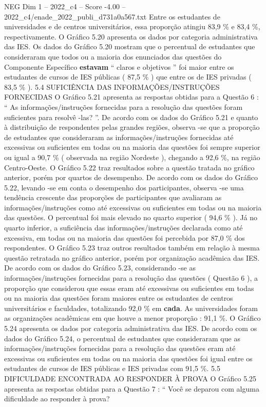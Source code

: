 \begin{textsample}{NEG Dim 1 – 2022\_c4 – Score -4.00 – 2022\_c4/enade\_2022\_publi\_d731a0a567.txt}
Entre os estudantes de universidades e de centros universitários, essa proporção atingiu 83,9 \% e 83,4 \%, respectivamente.
O Gráfico 5.20 apresenta os dados por categoria administrativa das IES.
Os dados do Gráfico 5.20 mostram que o percentual de estudantes que consideraram que todos ou a maioria dos enunciados das questões do Componente Específico \textbf{estavam} “ claros e objetivos ” foi maior entre os estudantes de cursos de IES públicas ( 87,5 \% ) que entre os de IES privadas ( 83,5 \% ). 5.4 SUFICIÊNCIA DAS INFORMAÇÕES/INSTRUÇÕES FORNECIDAS O Gráfico 5.21 apresenta as respostas obtidas para a Questão 6 : “ As informações/instruções fornecidas para a resolução das questões foram suficientes para resolvê -las? ”.
De acordo com os dados do Gráfico 5.21 e quanto à distribuição de respondentes pelas grandes regiões, observa -se que a proporção de estudantes que consideraram as informações/instruções fornecidas até excessivas ou suficientes em todas ou na maioria das questões foi sempre superior ou igual a 90,7 \% ( observada na região Nordeste ), chegando a 92,6 \%, na região Centro-Oeste.
O Gráfico 5.22 traz resultados sobre a questão tratada no gráfico anterior, porém por quartos de desempenho.
De acordo com os dados do Gráfico 5.22, levando -se em conta o desempenho dos participantes, observa -se uma tendência crescente das proporções de participantes que avaliaram as informações/instruções como até excessivas ou suficientes em todas ou na maioria das questões.
O percentual foi mais elevado no quarto superior ( 94,6 \% ).
Já no quarto inferior, a suficiência das informações/instruções declarada como até excessiva, em todas ou na maioria das questões foi percebida por 87,0 \% dos respondentes.
O Gráfico 5.23 traz outros resultados também em relação à mesma questão retratada no gráfico anterior, porém por organização acadêmica das IES.
De acordo com os dados do Gráfico 5.23, considerando -se as informações/instruções fornecidas para a resolução das questões ( Questão 6 ), a proporção que considerou que essas eram até excessivas ou suficientes em todas ou na maioria das questões foram maiores entre os estudantes de centros universitários e faculdades, totalizando 92,0 \% em \textbf{cada}.
As universidades foram as organizações acadêmicas em que houve a menor proporção : 91,1 \%.
O Gráfico 5.24 apresenta os dados por categoria administrativa das IES.
De acordo com os dados do Gráfico 5.24, o percentual de estudantes que consideraram que as informações/instruções fornecidas para a resolução das questões eram até excessivas ou suficientes em todas ou na maioria das questões foi igual entre os estudantes de cursos de IES públicas e IES privadas com 91,5 \%. 5.5 DIFICULDADE ENCONTRADA AO RESPONDER À PROVA O Gráfico 5.25 apresenta as respostas obtidas para a Questão 7 : “ Você se deparou com alguma dificuldade ao responder à prova?

\end{textsample}
